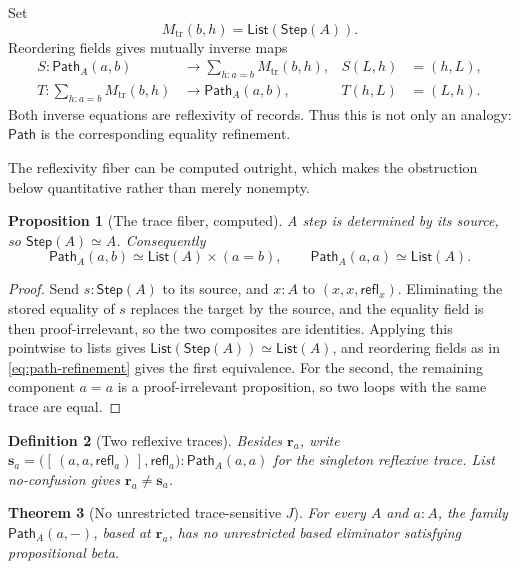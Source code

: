 \documentclass[10pt,reqno]{amsart}
\newtheorem{theorem}{Theorem}[section]
\newtheorem{proposition}[theorem]{Proposition}
\newtheorem{definition}[theorem]{Definition}
\newcommand{\Eqv}{\simeq}
\newcommand{\Step}{\mathsf{Step}}
\newcommand{\PathTy}{\mathsf{Path}}
\newcommand{\refl}{\mathsf{refl}}
\newcommand{\List}{\mathsf{List}}
\begin{document}
Set
\[
 M_{\mathrm{tr}}(b,h)=\List(\Step(A)).
\tag{9.4}\label{eq:trace-metadata}
\]
Reordering fields gives mutually inverse maps
\[
\begin{aligned}
 S:\PathTy_A(a,b)&\longrightarrow
      \sum_{h:a=b}M_{\mathrm{tr}}(b,h),
 & S(L,h)&=(h,L),\\
 T:\sum_{h:a=b}M_{\mathrm{tr}}(b,h)&\longrightarrow
      \PathTy_A(a,b),
 & T(h,L)&=(L,h).
\end{aligned}
\tag{9.5}\label{eq:path-refinement}
\]
Both inverse equations are reflexivity of records.  Thus this is not only an
analogy: \(\PathTy\) is the corresponding equality refinement.

The reflexivity fiber can be computed outright, which makes the obstruction
below quantitative rather than merely nonempty.

\begin{proposition}[The trace fiber, computed]
\label{prop:trace-fiber-computed}
A step is determined by its source, so \(\Step(A)\Eqv A\).  Consequently
\[
 \PathTy_A(a,b)\Eqv\List(A)\times(a=b),
 \qquad
 \PathTy_A(a,a)\Eqv\List(A).
\tag{9.6}\label{eq:trace-fiber-computed}
\]
\end{proposition}

\begin{proof}
Send \(s:\Step(A)\) to its source, and \(x:A\) to \((x,x,\refl_x)\).
Eliminating the stored equality of \(s\) replaces the target by the source, and
the equality field is then proof-irrelevant, so the two composites are
identities.  Applying this pointwise to lists gives
\(\List(\Step(A))\Eqv\List(A)\), and reordering fields as in
\eqref{eq:path-refinement} gives the first equivalence.  For the second, the
remaining component \(a=a\) is a proof-irrelevant proposition, so two loops with
the same trace are equal.
\end{proof}

\begin{definition}[Two reflexive traces]
\label{def:two-traces}
Besides \(\mathbf r_a\), write
\(\mathbf s_a=\bigl([\,(a,a,\refl_a)\,],\refl_a\bigr):\PathTy_A(a,a)\) for the
singleton reflexive trace.  List no-confusion gives
\(\mathbf r_a\ne\mathbf s_a\).
\end{definition}

\begin{theorem}[No unrestricted trace-sensitive \(J\)]
\label{thm:no-trace-j}
For every \(A\) and \(a:A\), the family \(\PathTy_A(a,-)\), based at
\(\mathbf r_a\), has no unrestricted based eliminator satisfying propositional
beta.
\end{theorem}
\end{document}

